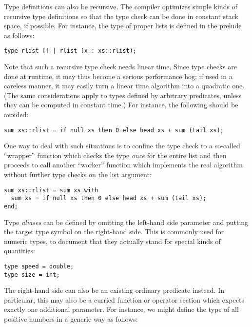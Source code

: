 \documentclass[a4paper,12pt]{article}
\begin{document}
Type definitions can also be recursive. The compiler optimizes simple kinds of recursive type definitions so that the type check can be done in constant stack space, if possible. For instance, the type of proper lists is defined in the prelude as follows:

\begin{lstlisting}
type rlist [] | rlist (x : xs::rlist);
\end{lstlisting}

Note that such a recursive type check needs linear time. Since type checks are done at runtime, it may thus become a serious performance hog; if used in a careless manner, it may easily turn a linear time algorithm into a quadratic one. (The same considerations apply to types defined by arbitrary predicates, unless they can be computed in constant time.) For instance, the following should be avoided:

\begin{lstlisting}
sum xs::rlist = if null xs then 0 else head xs + sum (tail xs);
\end{lstlisting}

One way to deal with such situations is to confine the type check to a so-called ``wrapper'' function which checks the type \emph{once} for the entire list and then proceeds to call another ``worker'' function which implements the real algorithm without further type checks on the list argument:

\begin{lstlisting}
sum xs::rlist = sum xs with
  sum xs = if null xs then 0 else head xs + sum (tail xs);
end;
\end{lstlisting}

Type \emph{aliases} can be defined by omitting the left-hand side parameter and putting the target type symbol on the right-hand side. This is commonly used for numeric types, to document that they actually stand for special kinds of quantities:

\begin{lstlisting}
type speed = double;
type size = int;
\end{lstlisting}

The right-hand side can also be an existing ordinary predicate instead. In particular, this may also be a curried function or operator section which expects exactly one additional parameter. For instance, we might define the type of all positive numbers in a generic way as follows:
\end{document}
